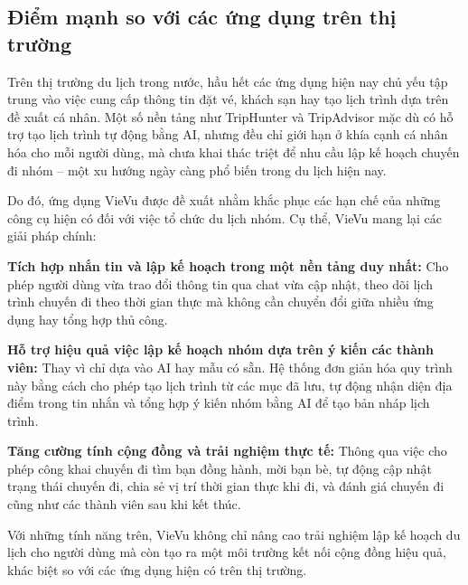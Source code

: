 \subsection{Điểm mạnh so với các ứng dụng trên thị trường}

Trên thị trường du lịch trong nước, hầu hết các ứng dụng hiện nay chủ yếu tập trung vào việc cung cấp thông tin đặt vé, khách sạn hay tạo lịch trình dựa trên đề xuất cá nhân. Một số nền tảng như TripHunter và TripAdvisor mặc dù có hỗ trợ tạo lịch trình tự động bằng AI, nhưng đều chỉ giới hạn ở khía cạnh cá nhân hóa cho mỗi người dùng, mà chưa khai thác triệt để nhu cầu lập kế hoạch chuyến đi nhóm – một xu hướng ngày càng phổ biến trong du lịch hiện nay.

Do đó, ứng dụng VieVu được đề xuất nhằm khắc phục các hạn chế của những công cụ hiện có đối với việc tổ chức du lịch nhóm. Cụ thể, VieVu mang lại các giải pháp chính:

\textbf{Tích hợp nhắn tin và lập kế hoạch trong một nền tảng duy nhất:}
Cho phép người dùng vừa trao đổi thông tin qua chat vừa cập nhật, theo dõi lịch trình chuyến đi theo thời gian thực mà không cần chuyển đổi giữa nhiều ứng dụng hay tổng hợp thủ công. 

\textbf{Hỗ trợ hiệu quả việc lập kế hoạch nhóm dựa trên ý kiến các thành viên:}
Thay vì chỉ dựa vào AI hay mẫu có sẵn. Hệ thống đơn giản hóa quy trình này bằng cách cho phép tạo lịch trình từ các mục đã lưu, tự động nhận diện địa điểm trong tin nhắn và tổng hợp ý kiến nhóm bằng AI để tạo bản nháp lịch trình.

\textbf{Tăng cường tính cộng đồng và trải nghiệm thực tế:}
Thông qua việc cho phép công khai chuyến đi tìm bạn đồng hành, mời bạn bè, tự động cập nhật trạng thái chuyến đi, chia sẻ vị trí thời gian thực khi đi, và đánh giá chuyến đi cũng như các thành viên sau khi kết thúc.

Với những tính năng trên, VieVu không chỉ nâng cao trải nghiệm lập kế hoạch du lịch cho người dùng mà còn tạo ra một môi trường kết nối cộng đồng hiệu quả, khác biệt so với các ứng dụng hiện có trên thị trường.


